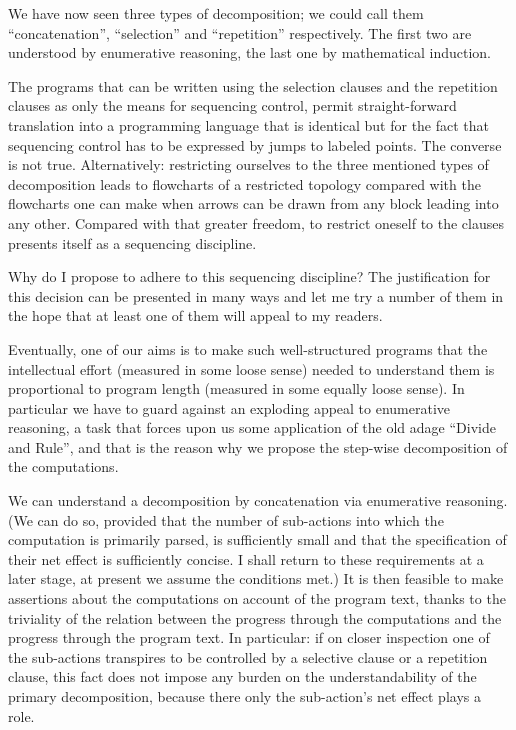 \documentclass[twoside,11pt]{book}
\begin{document}
We have now seen three types of decomposition; we could call them ``concatenation'', ``selection'' and ``repetition'' respectively. The first two are understood by enumerative reasoning, the last one by mathematical induction. 

The programs that can be written using the selection clauses and the repetition clauses as only the means for sequencing control, permit straight-forward translation into a programming language that is identical but for the fact that sequencing control has to be expressed by jumps to labeled points. The converse is not true. Alternatively: restricting ourselves to the three mentioned types of decomposition leads to flowcharts of a restricted topology compared with the flowcharts one can make when arrows can be drawn from any block leading into any other. Compared with that greater freedom, to restrict oneself to the clauses presents itself as a sequencing discipline.

Why do I propose to adhere to this sequencing discipline? The justification for this decision can be presented in many ways and let me try a number of them in the hope that at least one of them will appeal to my readers.

Eventually, one of our aims is to make such well-structured programs that the intellectual effort (measured in some loose sense) needed to understand them is proportional to program length (measured in some equally loose sense). In particular we have to guard against an exploding appeal to enumerative reasoning, a task that forces upon us some application of the old adage ``Divide and Rule'', and that is the reason why we propose the step-wise decomposition of the computations.

We can understand a decomposition by concatenation via enumerative reasoning. (We can do so, provided that the number of sub-actions into which the computation is primarily parsed, is sufficiently small and that the specification of their net effect is sufficiently concise. I shall return to these requirements at a later stage, at present we assume the conditions met.) It is then feasible to make assertions about the computations on account of the program text, thanks to the triviality of the relation between the progress through the computations and the progress through the program text. In particular: if on closer inspection one of the sub-actions transpires to be controlled by a selective clause or a repetition clause, this fact does not impose any burden on the understandability of the primary decomposition, because there only the sub-action's net effect plays a role.
\end{document}
